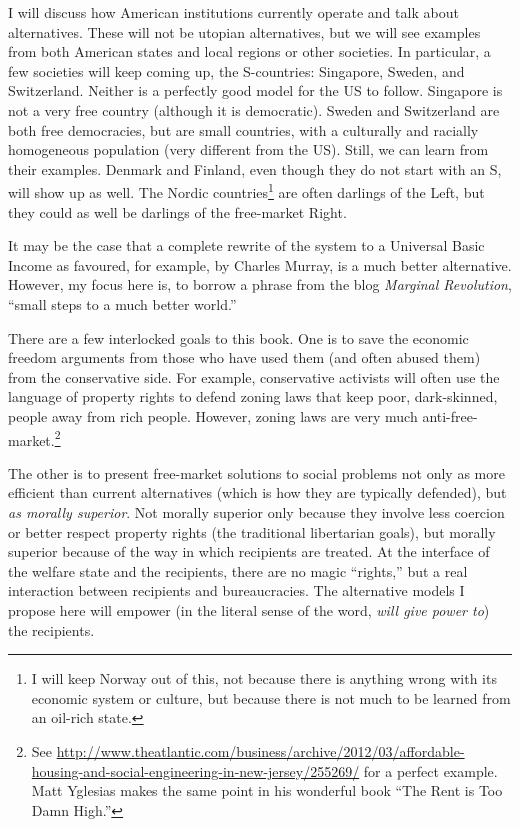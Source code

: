 I will discuss how American institutions currently operate and talk about
alternatives. These will not be utopian alternatives, but we will see examples
from both American states and local regions or other societies. In particular,
a few societies will keep coming up, the S-countries: Singapore, Sweden, and
Switzerland. Neither is a perfectly good model for the US to follow. Singapore
is not a very free country (although it is democratic). Sweden and Switzerland
are both free democracies, but are small countries, with a culturally and
racially homogeneous population (very different from the US). Still, we can
learn from their examples. Denmark and Finland, even though they do not start
with an S, will show up as well. The Nordic countries\footnote{I will keep
Norway out of this, not because there is anything wrong with its economic
system or culture, but because there is not much to be learned from an oil-rich
state.} are often darlings of the Left, but they could as well be darlings of
the free-market Right.

It may be the case that a complete rewrite of the system to a Universal Basic
Income as favoured, for example, by Charles Murray, is a much better
alternative. However, my focus here is, to borrow a phrase from the blog
\emph{Marginal Revolution}, ``small steps to a much better world.''

\bigskip
\bigskip

There are a few interlocked goals to this book. One is to save the economic
freedom arguments from those who have used them (and often abused them) from
the conservative side. For example, conservative activists will often use the
language of property rights to defend zoning laws that keep poor, dark-skinned,
people away from rich people. However, zoning laws are very much
anti-free-market.\footnote{See
\url{http://www.theatlantic.com/business/archive/2012/03/affordable-housing-and-social-engineering-in-new-jersey/255269/}
for a perfect example. Matt Yglesias makes the same point in his wonderful book
``The Rent is Too Damn High.''} %

The other is to present free-market solutions to social problems not only as
more efficient than current alternatives (which is how they are typically
defended), but \emph{as morally superior}. Not morally superior only because
they involve less coercion or better respect property rights (the
traditional libertarian goals), but morally superior because of the way in
which recipients are treated. At the interface of the welfare state and the
recipients, there are no magic ``rights,'' but a real interaction between
recipients and bureaucracies. The alternative models I propose here will empower
(in the literal sense of the word, \emph{will give power to}) the recipients.

